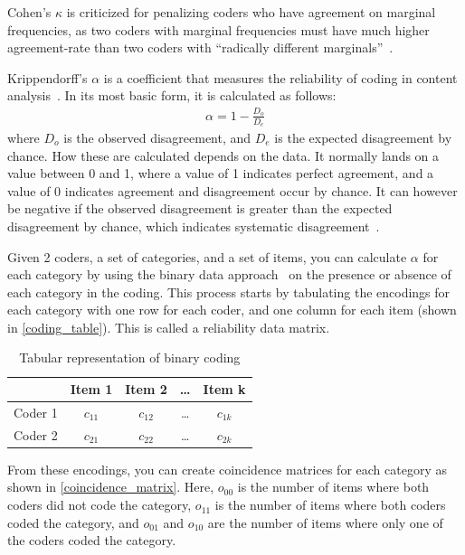 Cohen's \(\kappa \) is criticized for penalizing coders who have agreement on marginal frequencies, as two coders with marginal frequencies must have much higher agreement-rate than two coders with ``radically different marginals''\ \cite{krippendorff_content_2004}.

Krippendorff's \(\alpha \) is a coefficient that measures the reliability of coding in content analysis\ \cite{krippendorff_content_2004}. In its most basic form, it is calculated as follows:
\begin{align}
    \alpha = 1 - \frac{D_o}{D_e}
\end{align}
where \(D_o\) is the observed disagreement, and \(D_e\) is the expected disagreement by chance. How these are calculated depends on the data. It normally lands on a value between 0 and 1, where a value of 1 indicates perfect agreement, and a value of 0 indicates agreement and disagreement occur by chance. It can however be negative if the observed disagreement is greater than the expected disagreement by chance, which indicates systematic disagreement\ \cite{krippendorff_content_2004}.


Given 2 coders, a set of categories, and a set of items, you can calculate \(\alpha \) for each category by using the binary data approach\ \cite{krippendorff_content_2004} on the presence or absence of each category in the coding. This process starts by tabulating the encodings for each category with one row for each coder, and one column for each item (shown in \autoref{coding_table}). This is called a reliability data matrix.

\begin{table}
    \centering
    \caption{Tabular representation of binary coding}
    \label{coding_table}
    \begin{tabular}{l|cccc}
            & Item 1 & Item 2 & \ldots & Item k \\
            \hline
            Coder 1 & $c_{11}$ & $c_{12}$ & \ldots & $c_{1k}$ \\
            Coder 2 & $c_{21}$ & $c_{22}$ & \ldots & $c_{2k}$
    \end{tabular}
\end{table}

From these encodings, you can create coincidence matrices for each category as shown in \autoref{coincidence_matrix}. Here, \(o_{00}\) is the number of items where both coders did not code the category, \(o_{11}\) is the number of items where both coders coded the category, and \(o_{01}\) and \(o_{10}\) are the number of items where only one of the coders coded the category.

